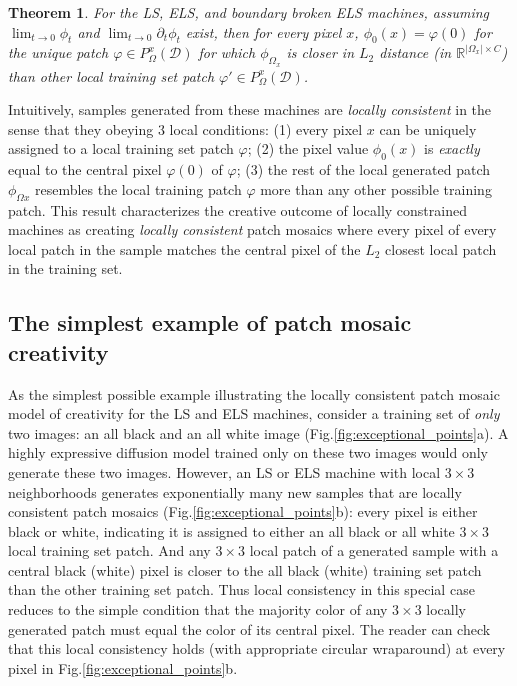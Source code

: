 \documentclass{article}
\theoremstyle{plain}
\newtheorem{theorem}{Theorem}[section]
\theoremstyle{definition}
\theoremstyle{remark}
\begin{document}
\begin{theorem} For the LS, ELS, and boundary broken ELS machines, assuming 
$\lim_{t \to 0} \phi_t$ 
and $\lim_{t \to 0} \partial_t\phi_t$ exist, 
then for every pixel $x$, $\phi_0(x) = \varphi(0)$ for the unique patch $\varphi \in P_{\Omega}^x(\mathcal{D})$ for which $\phi_{\Omega_x}$ is closer in $L_2$ distance (in 
$\mathbb{R}^{|\Omega_x|\times C}$)
than other local training set patch $\varphi' \in P_{\Omega}^x(\mathcal{D})$. 
\end{theorem}


Intuitively, samples generated from these machines are {\it locally consistent} in the sense that they obeying $3$ local conditions: (1) every pixel $x$ can be uniquely assigned to a local training set patch $\varphi$; (2) the pixel value $\phi_0(x)$ is {\it exactly} equal to the central pixel $\varphi(0)$ of $\varphi$; (3) the rest of the local generated patch $\phi_{\Omega x}$ resembles the local training patch $\varphi$ more than any other possible training patch.  This result characterizes the creative outcome of locally constrained machines as creating {\it locally consistent} patch mosaics where every pixel of every local patch in the sample matches the central pixel of the $L_2$ closest local patch in the training set.   

\subsection{The simplest example of patch mosaic creativity}

As the simplest possible example illustrating the locally consistent patch mosaic model of creativity for the LS and ELS machines, consider a training set of {\it only} two images: an all black and an all white image (Fig.\ref{fig:exceptional_points}a).  A highly expressive diffusion model trained only on these two images would only generate these two images.  However, an LS or ELS machine with local $3\times 3$ neighborhoods generates exponentially many new samples that are locally consistent patch mosaics (Fig.\ref{fig:exceptional_points}b): every pixel is either black or white, indicating it is assigned to either an all black or all white $3\times 3$ local training set patch.  And any $3\times3$ local patch of a generated sample with a central black (white) pixel is closer to the all black (white) training set patch than the other training set patch.  Thus local consistency in this special case reduces to the simple condition that the majority color of any $3\times3$ locally generated patch must equal the color of its central pixel.   The reader can check that this local consistency holds (with appropriate circular wraparound) at every pixel in Fig.\ref{fig:exceptional_points}b.
\end{document}
